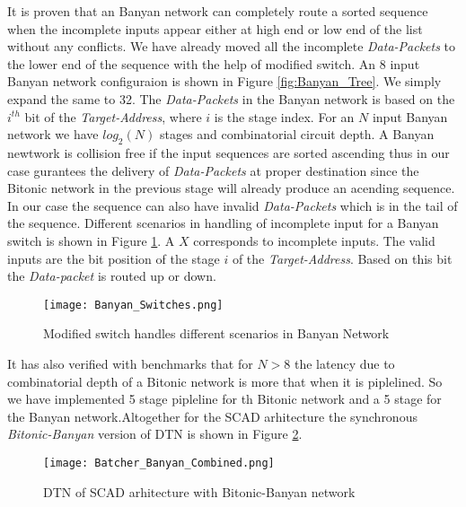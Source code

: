 					      It is proven \cite{batcher_banyan_ref} that 
					      an Banyan network can completely route a sorted sequence when the incomplete inputs appear either at high end or low end of the list without any conflicts. We have already moved all the incomplete \textit{Data-Packets}
					      to the lower end of the sequence with the help of modified switch. An 8 input Banyan network configuraion is shown in Figure \ref{fig:Banyan_Tree}. We simply expand the same to 32.
					      The \textit{Data-Packets} in the Banyan network is based on the $i^{th}$ bit of the \textit{Target-Address}, where $i$ is the stage index. For an $N$ input Banyan network we have $log_{2}(N)$ 
					      stages and combinatorial circuit depth. A Banyan newtwork is collision free if the input sequences are sorted ascending
					      thus in our case gurantees the delivery of \textit{Data-Packets} at proper destination since the Bitonic network in the previous stage will already produce an acending sequence. In our case 
					      the sequence can also have invalid \textit{Data-Packets} which is in the tail of the sequence. Different scenarios in handling of incomplete input for a Banyan switch is shown in Figure \ref{fig:Banyan_Switches}.
					      A $X$ corresponds to incomplete inputs. The valid inputs are the bit position of the stage $i$ of the \textit{Target-Address}. Based on this bit the \textit{Data-packet} is routed up or down.
					      \begin{figure}[!ht]
						      \texttt{[image: Banyan\_Switches.png]}
						      \caption{Modified switch handles different scenarios in Banyan Network }
					      \label{fig:Banyan_Switches}
					      \end{figure}
					      It has also verified with benchmarks \cite{sorting_network_on_fpgas} that for $N > 8$ the latency due to combinatorial depth of a Bitonic network is more that when it is piplelined. So we have implemented 5 stage pipleline 
					      for th Bitonic network and a 5 stage for the Banyan network.Altogether for the SCAD arhitecture the synchronous \textit{Bitonic-Banyan} version of DTN is shown in Figure \ref{fig:Batcher_Banyan_Combined}.
					      \begin{figure}[!ht]
						      \texttt{[image: Batcher\_Banyan\_Combined.png]}
						      \caption{DTN of SCAD arhitecture with Bitonic-Banyan network}
					      \label{fig:Batcher_Banyan_Combined}
					      \end{figure}

